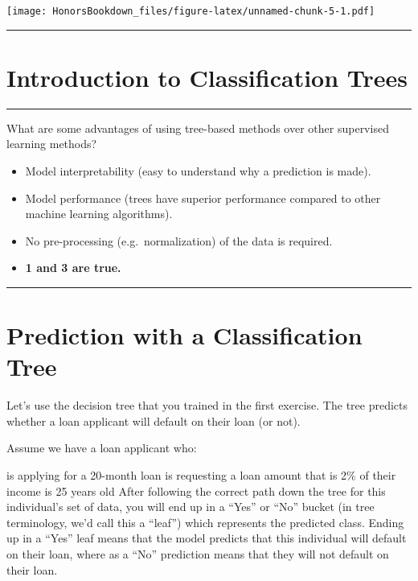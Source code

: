 \documentclass[
]{book}
\providecommand{\tightlist}{%
  \setlength{\itemsep}{0pt}\setlength{\parskip}{0pt}}
\begin{document}
\texttt{[image: HonorsBookdown\_files/figure-latex/unnamed-chunk-5-1.pdf]}

\begin{center}\rule{0.5\linewidth}{0.5pt}\end{center}

\hypertarget{introduction-to-classification-trees}{%
\section{Introduction to Classification Trees}\label{introduction-to-classification-trees}}

\begin{center}\rule{0.5\linewidth}{0.5pt}\end{center}

What are some advantages of using tree-based methods over other supervised learning methods?

\begin{itemize}
\tightlist
\item
  Model interpretability (easy to understand why a prediction is made).
\item
  Model performance (trees have superior performance compared to other machine learning algorithms).
\item
  No pre-processing (e.g.~normalization) of the data is required.
\item
  \textbf{1 and 3 are true.}
\end{itemize}

\begin{center}\rule{0.5\linewidth}{0.5pt}\end{center}

\hypertarget{prediction-with-a-classification-tree}{%
\section{Prediction with a Classification Tree}\label{prediction-with-a-classification-tree}}

Let's use the decision tree that you trained in the first exercise. The tree predicts whether a loan applicant will default on their loan (or not).

Assume we have a loan applicant who:

is applying for a 20-month loan
is requesting a loan amount that is 2\% of their income
is 25 years old
After following the correct path down the tree for this individual's set of data, you will end up in a ``Yes'' or ``No'' bucket (in tree terminology, we'd call this a ``leaf'') which represents the predicted class. Ending up in a ``Yes'' leaf means that the model predicts that this individual will default on their loan, where as a ``No'' prediction means that they will not default on their loan.
\end{document}
